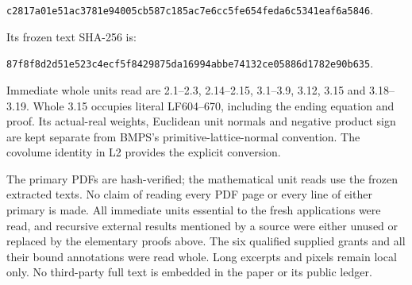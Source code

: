 \documentclass[
  11pt,
]{article}
\begin{document}
\texttt{c2817a01e51ac3781e94005cb587c185ac7e6cc5fe654feda6c5341eaf6a5846}.

Its frozen text SHA-256 is:

\texttt{87f8f8d2d51e523c4ecf5f8429875da16994abbe74132ce05886d1782e90b635}.

Immediate whole units read are 2.1--2.3, 2.14--2.15, 3.1--3.9, 3.12,
3.15 and 3.18--3.19. Whole 3.15 occupies literal LF604--670, including
the ending equation and proof. Its actual-real weights, Euclidean unit
normals and negative product sign are kept separate from BMPS's
primitive-lattice-normal convention. The covolume identity in L2
provides the explicit conversion.

The primary PDFs are hash-verified; the mathematical unit reads use the
frozen extracted texts. No claim of reading every PDF page or every line
of either primary is made. All immediate units essential to the fresh
applications were read, and recursive external results mentioned by a
source were either unused or replaced by the elementary proofs above.
The six qualified supplied grants and all their bound annotations were
read whole. Long excerpts and pixels remain local only. No third-party
full text is embedded in the paper or its public ledger.
\end{document}
